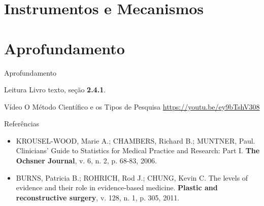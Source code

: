 \documentclass{beamer}
\begin{document}
\section{Instrumentos e Mecanismos}

\section{Aprofundamento}

\begin{frame}{Aprofundamento}
  \begin{block}{Leitura}
    Livro texto, seção {\bf 2.4.1}.
  \end{block}
  \begin{block}{Vídeo}
    O Método Científico e os Tipos de Pesquisa \href{https://youtu.be/ey9bTshV308}{https://youtu.be/ey9bTshV308}
  \end{block}

\end{frame}

\begin{frame}{Referências}
  \begin{itemize}
    \tiny
  \item KROUSEL-WOOD, Marie A.; CHAMBERS, Richard B.; MUNTNER, Paul. Clinicians' Guide to Statistics for Medical Practice and Research: Part I. {\bf The Ochsner Journal}, v. 6, n. 2, p. 68-83, 2006.
  \item BURNS, Patricia B.; ROHRICH, Rod J.; CHUNG, Kevin C. The levels of evidence and their role in evidence-based medicine. {\bf Plastic and reconstructive surgery}, v. 128, n. 1, p. 305, 2011.
  \end{itemize}
\end{frame}







\end{document}

